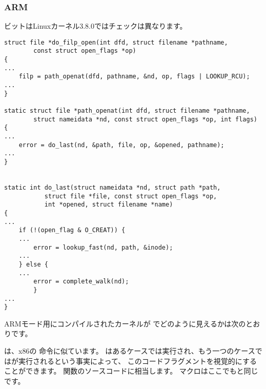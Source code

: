 ﻿\subsubsection{ARM}


ビットはLinuxカーネル3.8.0ではチェックは異なります。

\begin{lstlisting}[caption=linux kernel 3.8.0,style=customc]
struct file *do_filp_open(int dfd, struct filename *pathname,
		const struct open_flags *op)
{
...
	filp = path_openat(dfd, pathname, &nd, op, flags | LOOKUP_RCU);
...
}

static struct file *path_openat(int dfd, struct filename *pathname,
		struct nameidata *nd, const struct open_flags *op, int flags)
{
...
	error = do_last(nd, &path, file, op, &opened, pathname);
...
}


static int do_last(struct nameidata *nd, struct path *path,
		   struct file *file, const struct open_flags *op,
		   int *opened, struct filename *name)
{
...
	if (!(open_flag & O_CREAT)) {
    ...
		error = lookup_fast(nd, path, &inode);
    ...
	} else {
    ...
		error = complete_walk(nd);
        }
...
}
\end{lstlisting}

ARMモード用にコンパイルされたカーネルが \IDA でどのように見えるかは次のとおりです。



は、x86の \TEST 命令に似ています。 
はあるケースでは実行され、もう一つのケースではが実行されるという事実によって、
このコードフラグメントを視覚的にすることができます。 
関数のソースコードに相当します。 
マクロはここでもと同じです。
